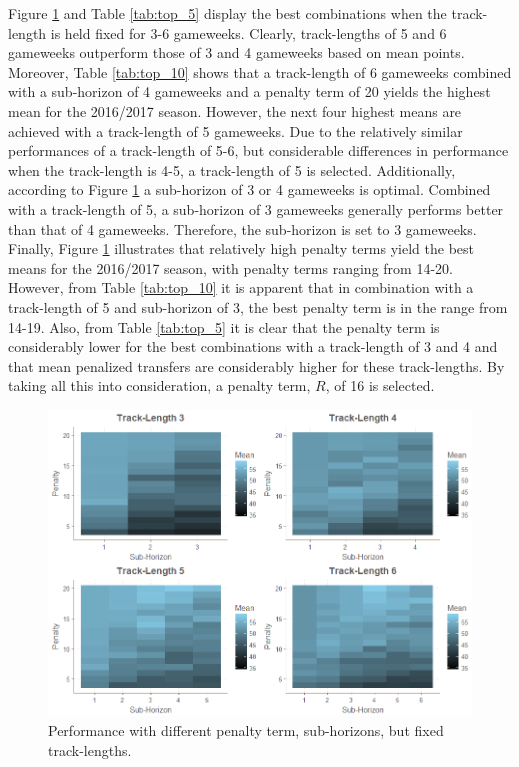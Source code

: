 Figure \ref{fig:fixed_f_hor} and Table \ref{tab:top_5} display the best combinations when the track-length is held fixed for 3-6 gameweeks. Clearly, track-lengths of 5 and 6 gameweeks outperform those of 3 and 4 gameweeks based on mean points. Moreover, Table \ref{tab:top_10} shows that a track-length of 6 gameweeks combined with a sub-horizon of 4 gameweeks and a penalty term of 20 yields the highest mean for the 2016/2017 season. However, the next four highest means are achieved with a track-length of 5 gameweeks. Due to the relatively similar performances of a track-length of 5-6, but considerable differences in performance when the track-length is 4-5, a track-length of 5 is selected. Additionally, according to Figure \ref{fig:fixed_f_hor} a sub-horizon of 3 or 4 gameweeks is optimal. Combined with a track-length of 5, a sub-horizon of 3 gameweeks generally performs better than that of 4 gameweeks. Therefore, the sub-horizon is set to 3 gameweeks. Finally, Figure \ref{fig:fixed_f_hor} illustrates that relatively high penalty terms yield the best means for the 2016/2017 season, with penalty terms ranging from 14-20. However, from Table \ref{tab:top_10} it is apparent that in combination with a track-length of 5 and sub-horizon of 3, the best penalty term is in the range from 14-19. Also, from Table \ref{tab:top_5} it is clear that the penalty term is considerably lower for the best combinations with a track-length of 3 and 4 and that mean penalized transfers are considerably higher for these track-lengths. By taking all this into consideration, a penalty term, $R$, of 16 is selected.

\newpar

\begin{figure}[!htb]
    \centering
    \includegraphics[scale=0.55]{fig/chapter_6/paramter_choice_fixed_f_hor.png}
    \caption{Performance with different penalty term, sub-horizons, but fixed track-lengths.}
\label{fig:fixed_f_hor}    
\end{figure}

